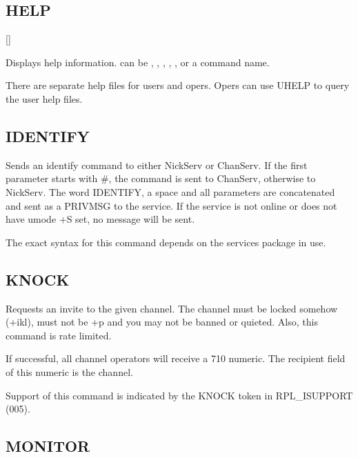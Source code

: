 \subsection{HELP}

    []

	Displays help information.  can be ,
	, , , ,
	or a command name.


	There are separate help files for users and opers. Opers can use UHELP
	to query the user help files.


\subsection{IDENTIFY}


	Sends an identify command to either NickServ or ChanServ. If the first
	parameter starts with \#, the command is sent to ChanServ, otherwise to
	NickServ. The word IDENTIFY, a space and all parameters are
	concatenated and sent as a PRIVMSG to the service. If the service is
	not online or does not have umode +S set, no message will be sent.

	The exact syntax for this command depends on the services package in
	use.


\subsection{KNOCK}


	Requests an invite to the given channel. The channel must be locked
	somehow (+ikl), must not be +p and you may not be banned or quieted.
	Also, this command is rate limited.

	If successful, all channel operators will receive a 710 numeric. The
	recipient field of this numeric is the channel.

	Support of this command is indicated by the KNOCK token in
	RPL\_ISUPPORT (005).


\subsection{MONITOR}

